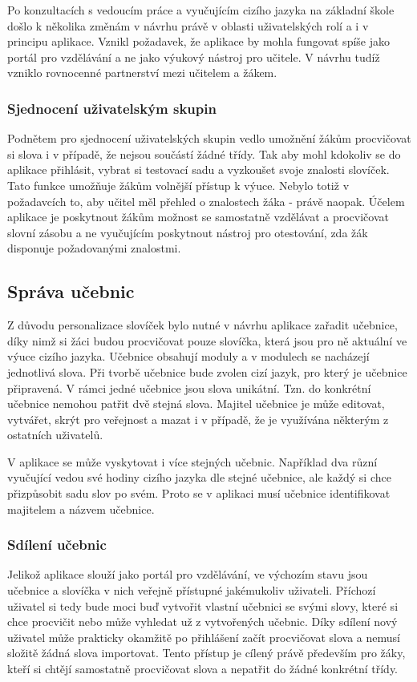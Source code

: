 \documentclass[a4paper,11pt,titlepage,fleqn]{article}
\begin{document}
        Po konzultacích s vedoucím práce a vyučujícím cizího jazyka na základní škole došlo k několika změnám v návrhu právě v oblasti uživatelských rolí a i v principu aplikace. Vznikl požadavek, že aplikace by mohla fungovat spíše jako portál pro vzdělávání a ne jako výukový nástroj pro učitele. V návrhu tudíž vzniklo rovnocenné partnerství mezi učitelem a žákem.

        \subsubsection{Sjednocení uživatelským skupin}
            Podnětem pro sjednocení uživatelských skupin vedlo umožnění žákům procvičovat si slova i v případě, že nejsou součástí žádné třídy. Tak aby mohl kdokoliv se do aplikace přihlásit, vybrat si testovací sadu a vyzkoušet svoje znalosti slovíček. Tato funkce umožňuje žákům volnější přístup k výuce. Nebylo totiž v požadavcích to, aby učitel měl přehled o znalostech žáka - právě naopak. Účelem aplikace je poskytnout žákům možnost se samostatně vzdělávat a procvičovat slovní zásobu a ne vyučujícím poskytnout nástroj pro otestování, zda žák disponuje požadovanými znalostmi. 

    \subsection{Správa učebnic}
        Z důvodu personalizace slovíček bylo nutné v návrhu aplikace zařadit učebnice, díky nimž si žáci budou procvičovat pouze slovíčka, která jsou pro ně aktuální ve výuce cizího jazyka. Učebnice obsahují moduly a v modulech se nacházejí jednotlivá slova. Při tvorbě učebnice bude zvolen cizí jazyk, pro který je učebnice připravená. V rámci jedné učebnice jsou slova unikátní. Tzn. do konkrétní učebnice nemohou patřit dvě stejná slova. Majitel učebnice je může editovat, vytvářet, skrýt pro veřejnost a mazat i v případě, že je využívána některým z ostatních uživatelů. 

        V aplikace se může vyskytovat i více stejných učebnic. Například dva různí vyučující vedou své hodiny cizího jazyka dle stejné učebnice, ale každý si chce přizpůsobit sadu slov po svém. Proto se v aplikaci musí učebnice identifikovat majitelem a názvem učebnice.

        \subsubsection{Sdílení učebnic}
            Jelikož aplikace slouží jako portál pro vzdělávání, ve výchozím stavu jsou učebnice a slovíčka v nich veřejně přístupné jakémukoliv uživateli. Příchozí uživatel si tedy bude moci buď vytvořit vlastní učebnici se svými slovy, které si chce procvičit nebo může vyhledat už z vytvořených učebnic. Díky sdílení nový uživatel může prakticky okamžitě po přihlášení začít procvičovat slova a nemusí složitě žádná slova importovat. Tento přístup je cílený právě především pro žáky, kteří si chtějí samostatně procvičovat slova a nepatřit do žádné konkrétní třídy.
\end{document}
